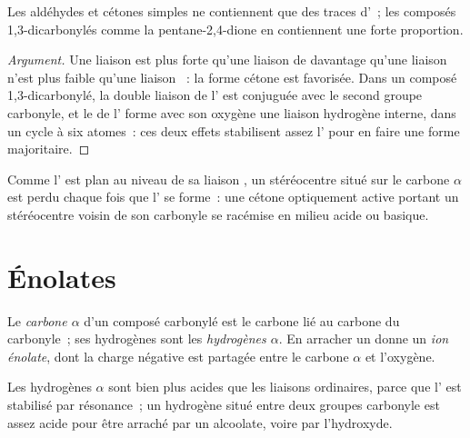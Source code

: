 \begin{proposition}\label{prop:b2:enolates-aldol:enol-content}
Les aldéhydes et cétones simples ne contiennent que des traces d'~; les composés
1,3-dicarbonylés comme la pentane-2,4-dione en contiennent une forte proportion.
\end{proposition}

\begin{proof}[Argument]
Une liaison  est plus forte qu'une liaison  de davantage qu'une liaison  n'est
plus faible qu'une liaison ~: la forme cétone est favorisée. Dans un composé 1,3-dicarbonylé,
la double liaison de l' est conjuguée avec le second groupe carbonyle, et le  de l'
forme avec son oxygène une liaison hydrogène interne, dans un cycle à six atomes~: ces deux effets
stabilisent assez l' pour en faire une forme majoritaire.
\end{proof}

Comme l' est plan au niveau de sa liaison , un stéréocentre situé sur le carbone $\alpha$
est perdu chaque fois que l' se forme~: une cétone optiquement active portant un stéréocentre
voisin de son carbonyle se racémise en milieu acide ou basique.

\section{Énolates}

\begin{definition}[Énolates]\label{def:b2:enolates-aldol:enolate}
Le \emph{carbone $\alpha$} d'un composé carbonylé est le carbone
lié au carbone du carbonyle~; ses hydrogènes sont les \emph{hydrogènes $\alpha$}.
En arracher un donne un \emph{ion énolate}, dont la
charge négative est partagée entre le carbone $\alpha$ et l'oxygène.
\end{definition}

\begin{proposition}\label{prop:b2:enolates-aldol:alpha-acidity}
Les hydrogènes $\alpha$ sont bien plus acides que les liaisons  ordinaires, parce que l'
est stabilisé par résonance~; un hydrogène situé entre deux groupes carbonyle est assez acide pour
être arraché par un alcoolate, voire par l'hydroxyde.
\end{proposition}

